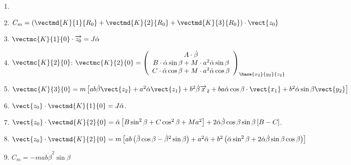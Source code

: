 \ifprof
\else
\ifcolle
\else
\begin{solution}
\begin{enumerate}
\item 
\item $C_m=\left(\vectmd{K}{1}{R_0}+\vectmd{K}{2}{R_0}+\vectmd{K}{3}{R_0}\right)\cdot \vect{z_0}$
\item  $ \vectmc{K}{1}{0}\cdot\overrightarrow{z_0} = J \dot{\alpha}$
\item  $\vectmc{K}{2}{0}$: $
\vectmc{K}{2}{0}=\left(
\begin{array}{c}
A\cdot \dot{\beta}\\
B\cdot \dot{\alpha} \sin\beta+M\cdot a^2 \dot{\alpha}\sin\beta\\
C\cdot \dot{\alpha} \cos\beta+M\cdot a^2 \dot{\alpha}\cos\beta\\
\end{array}
\right)_{\base{{x}_2}{{y}_2}{{z}_2}}\\
$
\item $
\vectmc{K}{3}{0}=m\left[a b\dot{\beta} \vect{z_2}+a^2 \dot{\alpha}\vect{z_{1}}+b^2 \dot{\beta}\overrightarrow{x}_2+b a \dot{\alpha} \cos\beta\cdot \vect{x_{1}}+b^2 \dot{\alpha}\sin\beta \vect{y_{2}}\right]
$
\item $\vect{z_0}\cdot \vectmd{K}{1}{0}=J \ddot{\alpha}$.
\item $\vect{z_0}\cdot \vectmd{K}{2}{0}=\ddot{\alpha}\left[B\sin^2\beta+C\cos^2\beta+Ma^2\right]
+2\dot{\alpha}\dot{\beta} \cos\beta \sin\beta\left[B-C\right]$.

\item $\vect{z_0}\cdot \vectmd{K}{2}{0}=m\left[a b\left(\ddot{\beta}\cos\beta-\dot{\beta}^2\sin\beta\right)+a^2\ddot{\alpha}+b^2\left(\ddot{\alpha}\sin^2\beta+2\dot{\alpha}\dot{\beta}\sin\beta\cos\beta\right)\right]$
\item $
C_m=-mab\dot{\beta}^2\sin\beta
$
\end{enumerate}
\end{solution}%

\fi
\fi
